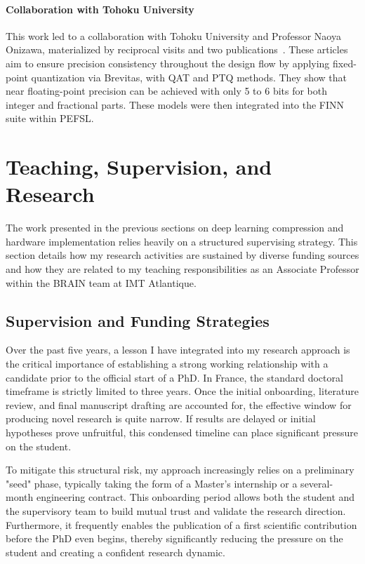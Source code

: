 \documentclass[11pt]{report}
\begin{document}
\paragraph{Collaboration with Tohoku University}

This work led to a collaboration with Tohoku University and Professor Naoya Onizawa, materialized by reciprocal visits and two publications~\cite{kanda:hal-04984380,kanda:hal-04984381}. These articles aim to ensure precision consistency throughout the design flow by applying fixed-point quantization via Brevitas, with QAT and PTQ methods. They show that near floating-point precision can be achieved with only 5 to 6 bits for both integer and fractional parts. These models were then integrated into the FINN suite within PEFSL.

\newpage
\section{Teaching, Supervision, and Research}
\label{sec:transmission_mentoring}

The work presented in the previous sections on deep learning compression and hardware implementation relies heavily on a structured supervising strategy. This section details how my research activities are sustained by diverse funding sources and how they are related to my teaching responsibilities as an Associate Professor within the BRAIN team at IMT Atlantique.

\subsection{Supervision and Funding Strategies}
\label{sec:mentoring_funding}

Over the past five years, a lesson I have integrated into my research approach is the critical importance of establishing a strong working relationship with a candidate prior to the official start of a PhD. In France, the standard doctoral timeframe is strictly limited to three years. Once the initial onboarding, literature review, and final manuscript drafting are accounted for, the effective window for producing novel research is quite narrow. If results are delayed or initial hypotheses prove unfruitful, this condensed timeline can place significant pressure on the student.

To mitigate this structural risk, my approach increasingly relies on a preliminary "seed" phase, typically taking the form of a Master's internship or a several-month engineering contract. This onboarding period allows both the student and the supervisory team to build mutual trust and validate the research direction. Furthermore, it frequently enables the publication of a first scientific contribution before the PhD even begins, thereby significantly reducing the pressure on the student and creating a confident research dynamic.
\end{document}
